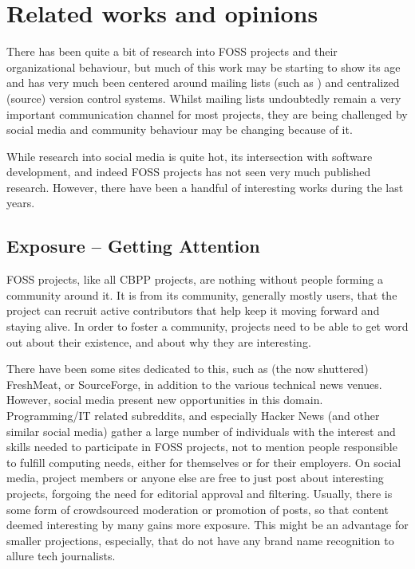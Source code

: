 \documentclass[a4paper,11pt]{article} %
\begin{document}
\section{Related works and opinions}
There has been quite a bit of research into FOSS projects and their
organizational behaviour, but much of this work may be starting to show its
age and has very much been centered around mailing lists (such as
\cite{Oezbek10Cancer, singh2011network}) and centralized (source) version
control systems. Whilst mailing lists undoubtedly remain a very important
communication channel for most projects, they are being challenged by social
media and community behaviour may be changing because of it.

While research into social media is quite hot, its intersection with
software development, and indeed FOSS projects has not seen very much
published research. However, there have been a handful of interesting works
during the last years.

\subsection{Exposure -- Getting Attention}
FOSS projects, like all CBPP projects, are nothing without people
forming a community around it. It is from its community, generally
mostly users, that the project can recruit active contributors that
help keep it moving forward and staying alive. In order to foster a
community, projects need to be able to get word out about their
existence, and about why they are interesting.

There have been some sites dedicated to this, such as (the now
shuttered) FreshMeat, or SourceForge, in addition to the various
technical news venues. However, social media present new opportunities
in this domain. Programming/IT related subreddits, and especially
Hacker News (and other similar social media) gather a large number of
individuals with the interest and skills needed to participate in FOSS
projects, not to mention people responsible to fulfill computing
needs, either for themselves or for their employers.  On social media,
project members or anyone else are free to just post about interesting
projects, forgoing the need for editorial approval and
filtering. Usually, there is some form of crowdsourced moderation or
promotion of posts, so that content deemed interesting by many gains
more exposure. This might be an advantage for smaller projections,
especially, that do not have any brand name recognition to allure tech
journalists.
\end{document}

